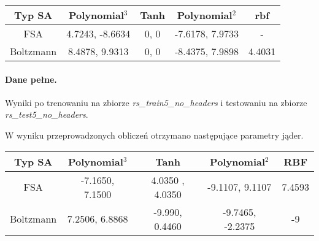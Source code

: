 \documentclass{article}
\begin{document}
\begin{center}
    \begin{tabular}{ | c | c | c | c | c | }
    \hline
    Typ SA & \textbf{Polynomial}$^{3}$ & \textbf{Tanh} & \textbf{Polynomial$^{2}$} & \textbf{rbf} \\ \hline
    FSA & 4.7243, -8.6634 & 0, 0 & -7.6178, 7.9733 & - \\ \hline
   Boltzmann & 8.4878, 9.9313 & 0, 0 & -8.4375, 7.9898 & 4.4031\\ \hline
    \end{tabular}
\end{center}

\paragraph {Dane pełne.}
Wyniki po trenowaniu na zbiorze \textit{rs\_train5\_no\_headers} i testowaniu na zbiorze \textit{rs\_test5\_no\_headers}.
\pgfplotsset{width=7cm,compat=1.4}
\begin{center}
\end{center}

W wyniku przeprowadzonych obliczeń otrzymano następujące parametry jąder.
\begin{center}
    \begin{tabular}{ | c | c | c | c | c | }
    \hline
    Typ SA & \textbf{Polynomial}$^{3}$ & \textbf{Tanh} & \textbf{Polynomial$^{2}$} & \textbf{RBF} \\ \hline
    FSA & -7.1650, 7.1500 & 4.0350 , 4.0350 & -9.1107, 9.1107 & 7.4593  \\ \hline
   Boltzmann & 7.2506, 6.8868 & -9.990, 0.4460 & -9.7465, -2.2375 & -9\\ \hline
    \end{tabular}
\end{center}
\end{document}
